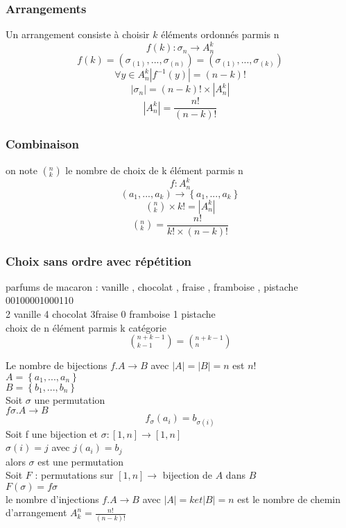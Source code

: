 \documentclass{report}
\begin{document}
\subsubsection{Arrangements}
Un arrangement consiste à choisir $k$ éléments ordonnés parmis n\\
$$f(k): \sigma_n \rightarrow A^k_n$$
$$f(k)=\left(\sigma_{(1)},...,\sigma_{(n)}\right)=\left(\sigma_{(1)},...,\sigma_{(k)}\right)$$
$$\forall y \in A^k_n \left|f^{-1}(y)\right|=(n-k)!$$
$$\left|\sigma_n\right|=(n-k)!\times \left|A^k_n\right|$$
$$\left|A^k_n\right|=\frac{n!}{(n-k)!}$$
\subsubsection{Combinaison}
on note $\left(^n_k\right)$ le nombre de choix de k élément parmis n\\
$$f: A^k_n$$
$$\left(a_1,...,a_k\right)\rightarrow\left\{a_1,...,a_k\right\}$$
$$\left(^n_k\right) \times k!= \left|A^k_n\right|$$
$$\left(^n_k\right) = \frac{n!}{k! \times (n-k)!}$$
\subsubsection{Choix sans ordre avec répétition}
parfums de macaron : vanille , chocolat , fraise , framboise , pistache\\
00100001000110\\
2 vanille 4 chocolat 3fraise 0 framboise 1 pistache\\
choix de n élément parmis k catégorie\\
$$\left(^{n+k-1}_{k-1}\right)=\left(^{n+k-1}_{n}\right)$$

Le nombre de bijections 
$f.A\rightarrow B$ avec $\left|A\right|=\left|B\right|=n$ est $n!$\\
$A=\left\{a_1,...,a_n\right\}$\\
$B=\left\{b_1,...,b_n\right\}$\\
Soit $\sigma$ une permutation\\
$f\sigma . A \rightarrow B$\\
$$f_{\sigma}\left(a_i\right)=b_{\sigma\left(i\right)}$$
Soit f une bijection et $\sigma : \left[1,n\right]\rightarrow\left[1,n\right]$\\
$\sigma(i) =j$ avec $j(a_i)=b_j $\\
alors $\sigma$ est une permutation \\

Soit $F$ : permutations sur $[1,n]\rightarrow$ bijection de $A$ dans $B$\\
$F\left(\sigma\right)=f\sigma$\\
le nombre d'injections $f.A\rightarrow B$ avec $\left|A\right|=k et \left|B\right|=n$ est le nombre de chemin d'arrangement $A^n_k=\frac{n!}{(n-k)!}$\\
\end{document}
